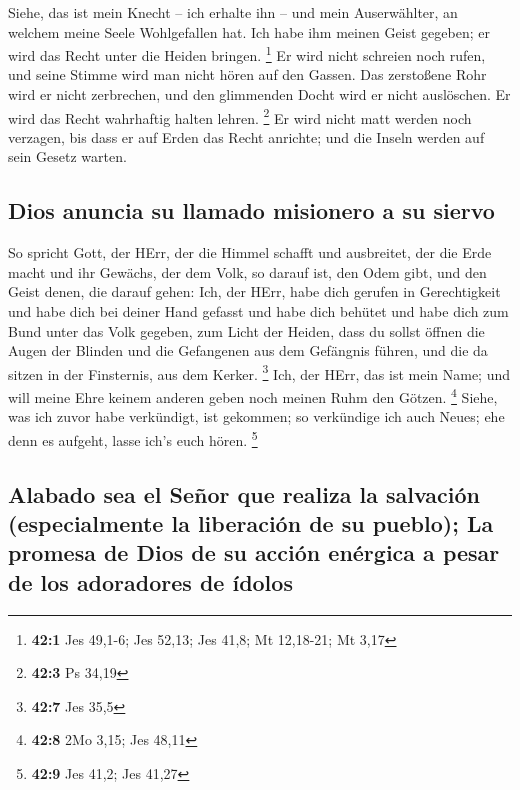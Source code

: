  Siehe, das ist mein Knecht -- ich erhalte ihn -- und mein
Auserwählter, an welchem meine Seele Wohlgefallen hat. Ich habe ihm
meinen Geist gegeben; er wird das Recht unter die Heiden bringen.
\footnote{\textbf{42:1} Jes 49,1-6; Jes 52,13; Jes 41,8; Mt 12,18-21; Mt
  3,17}  Er wird nicht schreien noch rufen, und seine
Stimme wird man nicht hören auf den Gassen.  Das
zerstoßene Rohr wird er nicht zerbrechen, und den glimmenden Docht wird
er nicht auslöschen. Er wird das Recht wahrhaftig halten lehren.
\footnote{\textbf{42:3} Ps 34,19}  Er wird nicht matt
werden noch verzagen, bis dass er auf Erden das Recht anrichte; und die
Inseln werden auf sein Gesetz warten.

\hypertarget{dios-anuncia-su-llamado-misionero-a-su-siervo}{%
\subsection{Dios anuncia su llamado misionero a su
siervo}\label{dios-anuncia-su-llamado-misionero-a-su-siervo}}

 So spricht Gott, der HErr, der die Himmel schafft und
ausbreitet, der die Erde macht und ihr Gewächs, der dem Volk, so darauf
ist, den Odem gibt, und den Geist denen, die darauf gehen:
 Ich, der HErr, habe dich gerufen in Gerechtigkeit und
habe dich bei deiner Hand gefasst und habe dich behütet und habe dich
zum Bund unter das Volk gegeben, zum Licht der Heiden, 
dass du sollst öffnen die Augen der Blinden und die Gefangenen aus dem
Gefängnis führen, und die da sitzen in der Finsternis, aus dem Kerker.
\footnote{\textbf{42:7} Jes 35,5}  Ich, der HErr, das ist
mein Name; und will meine Ehre keinem anderen geben noch meinen Ruhm den
Götzen. \footnote{\textbf{42:8} 2Mo 3,15; Jes 48,11} 
Siehe, was ich zuvor habe verkündigt, ist gekommen; so verkündige ich
auch Neues; ehe denn es aufgeht, lasse ich's euch hören. \footnote{\textbf{42:9}
  Jes 41,2; Jes 41,27}

\hypertarget{alabado-sea-el-seuxf1or-que-realiza-la-salvaciuxf3n-especialmente-la-liberaciuxf3n-de-su-pueblo-la-promesa-de-dios-de-su-acciuxf3n-enuxe9rgica-a-pesar-de-los-adoradores-de-uxeddolos}{%
\subsection{Alabado sea el Señor que realiza la salvación (especialmente
la liberación de su pueblo); La promesa de Dios de su acción enérgica a
pesar de los adoradores de
ídolos}\label{alabado-sea-el-seuxf1or-que-realiza-la-salvaciuxf3n-especialmente-la-liberaciuxf3n-de-su-pueblo-la-promesa-de-dios-de-su-acciuxf3n-enuxe9rgica-a-pesar-de-los-adoradores-de-uxeddolos}}

